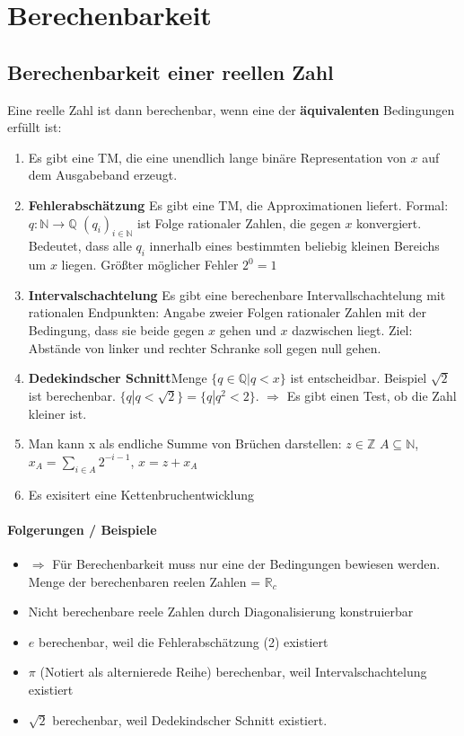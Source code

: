 \documentclass[ngerman]{scrartcl}
\begin{document}
\section{Berechenbarkeit} 

\subsection{Berechenbarkeit einer reellen Zahl}
Eine reelle Zahl ist dann berechenbar, wenn eine der \textbf{äquivalenten} Bedingungen erfüllt ist:

\begin{enumerate}
  \item Es gibt eine TM, die eine unendlich lange binäre Representation von $ x $ auf dem Ausgabeband erzeugt.  
  \item \textbf{Fehlerabschätzung} Es gibt eine TM, die Approximationen liefert. Formal: $ q:\mathbb{N}\rightarrow \mathbb{Q} $ $ (q_{i})_{i \in \mathbb{N}} $ ist Folge rationaler Zahlen, die gegen $ x $ konvergiert. Bedeutet, dass alle $ q_i $ innerhalb eines bestimmten beliebig kleinen Bereichs um $ x $ liegen. Größter möglicher Fehler $ 2^0 = 1 $
  \item \textbf{Intervalschachtelung} Es gibt eine berechenbare Intervallschachtelung mit rationalen Endpunkten: Angabe zweier Folgen rationaler Zahlen mit der Bedingung, dass sie beide gegen $ x $ gehen und $ x $ dazwischen liegt. Ziel: Abstände von linker und rechter Schranke soll gegen null gehen.
  \item \textbf{Dedekindscher Schnitt}Menge $ \{q \in \mathbb{Q} | q < x \} $ ist entscheidbar. Beispiel $ \sqrt{2} $ ist berechenbar. $ \{ q | q < \sqrt{2} \} = \{ q | q^2 < 2\}$. $ \Rightarrow $ Es gibt einen Test, ob die Zahl kleiner ist.
  \item Man kann x als endliche Summe von Brüchen darstellen: $ z \in \mathbb{Z} $ $ A \subseteq \mathbb{N} $, $ x_A = \sum_{i \in A} 2^{-i-1} $, $ x = z + x_A $
  \item Es exisitert eine Kettenbruchentwicklung
 \end{enumerate}
 \paragraph{Folgerungen / Beispiele}
\begin{itemize}
  \item $ \Rightarrow $ Für Berechenbarkeit muss nur eine der Bedingungen bewiesen werden. Menge der berechenbaren reelen Zahlen = $ \mathbb{R}_c $
  \item Nicht berechenbare reele Zahlen durch Diagonalisierung konstruierbar
  \item $ e $ berechenbar, weil die Fehlerabschätzung (2) existiert
  \item $ \pi $ (Notiert als alternierede Reihe) berechenbar, weil Intervalschachtelung existiert
  \item $ \sqrt{2} $ berechenbar, weil Dedekindscher Schnitt existiert.
 \end{itemize}
\end{document}
